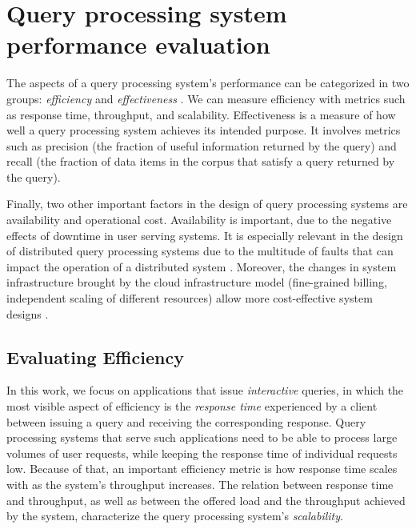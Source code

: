 \section{Query processing system performance evaluation}
\label{sec:requirements}


The aspects of a query processing system's performance can be categorized in two groups:
\textit{efficiency} and \textit{effectiveness} \cite{buttcher:informationretrieval}.
We can measure efficiency with metrics such as response time, throughput, and scalability.
Effectiveness is a measure of how well a query processing system achieves its intended purpose.
It involves metrics such as precision (the fraction of useful information returned by the query) and recall
(the fraction of data items in the corpus that satisfy a query returned by the query).

Finally, two other important factors in the design of query processing systems are availability and operational cost.
Availability is important, due to the negative effects of downtime in user serving systems.
It is especially relevant in the design of distributed query processing systems due to the multitude of faults that can
impact the operation of a distributed system \cite{kleppmann:designing}.
Moreover, the changes in system infrastructure brought by the cloud infrastructure model
(fine-grained billing, independent scaling of different resources) allow more cost-effective system designs \cite{vuppalapati:elasticqueryengine}.

\subsection{Evaluating Efficiency}

In this work, we focus on applications that issue \textit{interactive} queries,
in which the most visible aspect of efficiency is the \textit{response time} experienced by a client between issuing
a query and receiving the corresponding response.
Query processing systems that serve such applications need to be able to process large volumes of user requests,
while keeping the response time of individual requests low.
Because of that, an important efficiency metric is how response time scales with as the system's throughput increases.
The relation between response time and throughput, as well as between the offered load and the throughput achieved by the system,
characterize the query processing system's \textit{scalability}.

